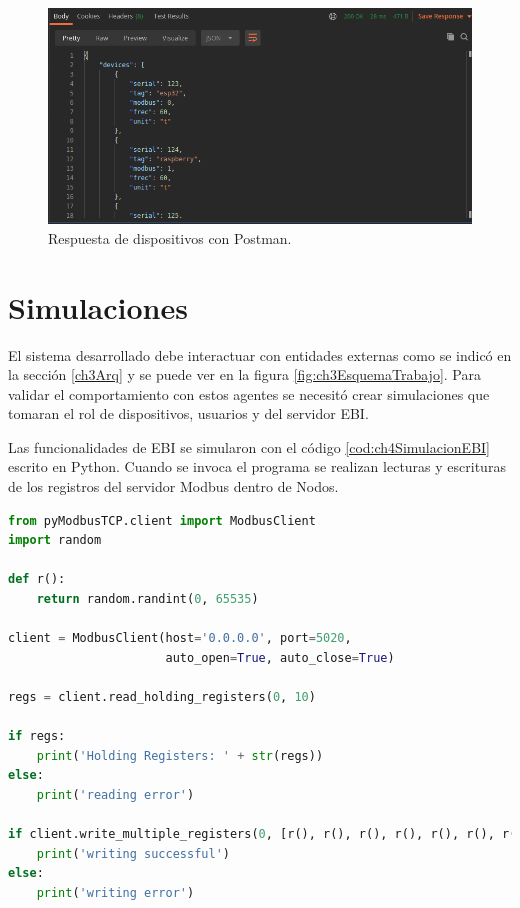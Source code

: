 \begin{figure}[h]
	\centering
	\includegraphics[width=\textwidth]{./Figures/postman4.png}
	\caption{Respuesta de dispositivos con Postman.}
	\label{fig:ch4Postman4}
\end{figure}

\section{Simulaciones}
El sistema desarrollado debe interactuar con entidades externas como se indicó en la sección \ref{ch3Arq} y se puede ver en la figura \ref{fig:ch3EsquemaTrabajo}.
Para validar el comportamiento con estos agentes se necesitó crear simulaciones que tomaran el rol de dispositivos, usuarios y del servidor EBI.

Las funcionalidades de EBI se simularon con el código \ref{cod:ch4SimulacionEBI} escrito en Python.
Cuando se invoca el programa se realizan lecturas y escrituras de los registros del servidor Modbus dentro de Nodos.

\begin{lstlisting}[language=python,label=cod:ch4SimulacionEBI,caption=Simulación de EBI.]
from pyModbusTCP.client import ModbusClient
import random

def r():
    return random.randint(0, 65535)

client = ModbusClient(host='0.0.0.0', port=5020,
                      auto_open=True, auto_close=True)

regs = client.read_holding_registers(0, 10)

if regs:
    print('Holding Registers: ' + str(regs))
else:
    print('reading error')

if client.write_multiple_registers(0, [r(), r(), r(), r(), r(), r(), r(), r(), r(), r()]):
    print('writing successful')
else:
    print('writing error')
\end{lstlisting}

